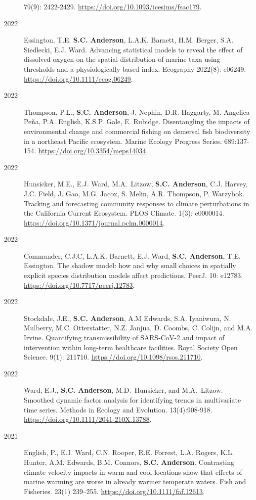 \begin{description}
79(9): 2422-2429. \url{https://doi.org/10.1093/icesjms/fsac179}.
\item[2022]
Essington, T.E. \textbf{S.C. Anderson}, L.A.K. Barnett, H.M. Berger,
S.A. Siedlecki, E.J. Ward. Advancing statistical models to reveal the
effect of dissolved oxygen on the spatial distribution of marine taxa
using thresholds and a physiologically based index. Ecography 2022(8):
e06249. \url{https://doi.org/10.1111/ecog.06249}.
\item[2022]
Thompson, P.L., \textbf{S.C. Anderson}, J. Nephin, D.R. Haggarty, M.
Angelica Peña, P.A. English, K.S.P. Gale, E. Rubidge. Disentangling the
impacts of environmental change and commercial fishing on demersal fish
biodiversity in a northeast Pacific ecosystem. Marine Ecology Progress
Series. 689:137-154. \url{https://doi.org/10.3354/meps14034}.
\item[2022]
Hunsicker, M.E., E.J. Ward, M.A.\ Litzow, \textbf{S.C. Anderson}, C.J.
Harvey, J.C. Field, J. Gao, M.G. Jacox, S. Melin, A.R. Thompson, P.
Warzybok. Tracking and forecasting community responses to climate
perturbations in the California Current Ecosystem. PLOS Climate. 1(3):
e0000014. \url{https://doi.org/10.1371/journal.pclm.0000014}.
\item[2022]
Commander, C.J.C, L.A.K. Barnett, E.J. Ward, \textbf{S.C. Anderson},
T.E. Essington. The shadow model: how and why small choices in spatially
explicit species distribution models affect predictions. PeerJ. 10:
e12783. \url{https://doi.org/10.7717/peerj.12783}.
\item[2022]
Stockdale, J.E., \textbf{S.C. Anderson}, A.M Edwards, S.A. Iyaniwura, N.
Mulberry, M.C. Otterstatter, N.Z. Janjua, D. Coombs, C. Colijn, and M.A.
Irvine. Quantifying transmissibility of SARS-CoV-2 and impact of
intervention within long-term healthcare facilities. Royal Society Open
Science. 9(1): 211710. \url{https://doi.org/10.1098/rsos.211710}.
\item[2022]
Ward, E.J., \textbf{S.C. Anderson}, M.D.\ Hunsicker, and M.A.\ Litzow.
Smoothed dynamic factor analysis for identifying trends in multivariate
time series. Methods in Ecology and Evolution. 13(4):908-918.
\url{https://doi.org/10.1111/2041-210X.13788}.
\item[2021]
English, P., E.J. Ward, C.N. Rooper, R.E. Forrest, L.A. Rogers, K.L.
Hunter, A.M. Edwards, B.M. Connors, \textbf{S.C. Anderson}. Contrasting
climate velocity impacts in warm and cool locations show that effects of
marine warming are worse in already warmer temperate waters. Fish and
Fisheries. 23(1) 239--255. \url{https://doi.org/10.1111/faf.12613}.

\end{description}
